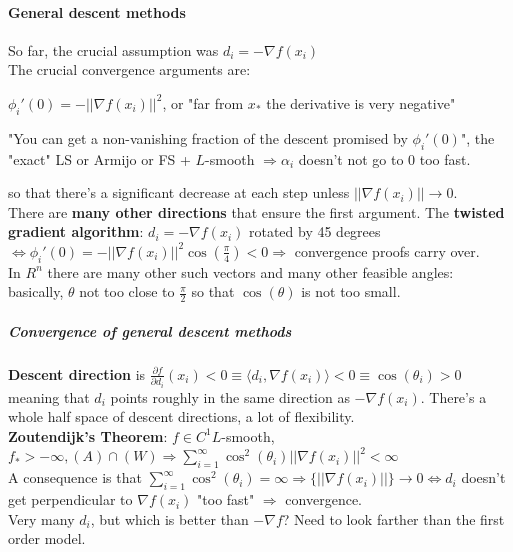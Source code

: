 \documentclass[10pt]{report}
\begin{document}
\paragraph{General descent methods} So far, the crucial assumption was $d_i = -\nabla f(x_i)$\\
The crucial convergence arguments are:
\begin{list}{}{}
	\item $\phi_i'(0) = -||\nabla f(x_i)||^2$, or "far from $x_*$ the derivative is very negative"
	\item "You can get a non-vanishing fraction of the descent promised by $\phi_i'(0)$", the "exact" LS or Armijo or FS + $L$-smooth $\Rightarrow \alpha_i$ doesn't not go to 0 too fast.
\end{list}
so that there's a significant decrease at each step unless $||\nabla f(x_i)||\rightarrow 0$.\\
There are \textbf{many other directions} that ensure the first argument. The \textbf{twisted gradient algorithm}: $d_i = -\nabla f(x_i)$ rotated by 45 degrees $\Leftrightarrow \phi_i'(0) = -||\nabla f(x_i)||^2\cos(\frac{\pi}{4}) < 0 \Rightarrow$ convergence proofs carry over.\\
In $R^n$ there are many other such vectors and many other feasible angles: basically, $\theta$ not too close to $\frac{\pi}{2}$ so that $\cos(\theta)$ is not too small.
\subparagraph{Convergence of general descent methods} \textbf{Descent direction} is $\frac{\partial f}{\partial d_i}(x_i) < 0 \equiv \langle d_i,\nabla f(x_i)\rangle < 0 \equiv \cos(\theta_i) > 0$ meaning that $d_i$ points roughly in the same direction as $-\nabla f(x_i)$. There's a whole half space of descent directions, a lot of flexibility.\\
\textbf{Zoutendijk's Theorem}: $f\in C^1 L$-smooth, $f_*>-\infty, (A)\cap(W)\Rightarrow\sum_{i=1}^\infty\cos^2(\theta_i)||\nabla f(x_i)||^2<\infty$\\
A consequence is that $\sum_{i=1}^\infty\cos^2(\theta_i) = \infty \Rightarrow \{||\nabla f(x_i)||\}\rightarrow 0 \Leftrightarrow d_i$ doesn't get perpendicular to $\nabla f(x_i)$ "too fast" $\Rightarrow$ convergence.\\
Very many $d_i$, but which is better than $-\nabla f$? Need to look farther than the first order model.
\end{document}
